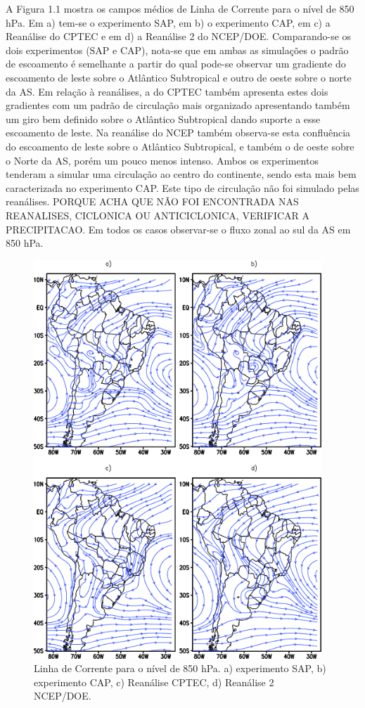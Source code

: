 A Figura 1.1 mostra os campos médios de Linha de Corrente para o nível de 850 hPa. Em a) tem-se o experimento SAP, em b) o experimento CAP, em c) a Reanálise do CPTEC e em d) a Reanálise 2 do NCEP/DOE. Comparando-se os dois experimentos (SAP e CAP), nota-se que em ambas as simulações o padrão de escoamento é semelhante a partir do qual pode-se observar um gradiente do escoamento de leste sobre o Atlântico Subtropical e outro de oeste sobre o norte da AS. Em relação à reanálises, a do CPTEC também apresenta estes dois gradientes com um padrão de circulação mais organizado apresentando também um giro bem definido sobre o Atlântico Subtropical dando suporte a esse escoamento de leste. Na reanálise do NCEP também  observa-se esta confluência do escoamento de leste sobre o Atlântico Subtropical, e também o de oeste sobre o Norte da AS, porém um pouco menos intenso. Ambos os experimentos tenderam a simular uma circulação ao centro do continente, sendo esta mais bem caracterizada no experimento CAP. Este tipo de circulação não foi simulado pelas reanálises. PORQUE ACHA QUE NÃO FOI ENCONTRADA NAS REANALISES, CICLONICA OU ANTICICLONICA, VERIFICAR A PRECIPITACAO. Em todos os casos  observar-se o fluxo zonal ao sul da AS em 850 hPa.

\begin{figure}[!hbp]
\centering
\includegraphics[height=15cm]{./figs/media_corrente_anl_850hPa.png}
\caption{Linha de Corrente para o nível de 850 hPa. a) experimento SAP, b) experimento CAP, c) Reanálise CPTEC, d) Reanálise 2 NCEP/DOE.}
\label{fig31}
\end{figure}

